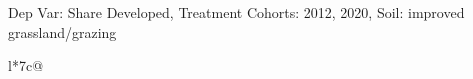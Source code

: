 \begin{table}[H]
\captionlistentry[table]{}
\label{table:beaver_land_class_DVis_land_class_3_SCg13_SSIGRG}
\scriptsize %
Dep Var: Share Developed, Treatment Cohorts: 2012, 2020, Soil: improved grassland/grazing \\
\begin{threeparttable}
\begin{tabulary}{\textwidth}{l*{7}{c}@{}}
\toprule \toprule
\noalign{\smallskip}
\noalign{\smallskip}
\midrule \bottomrule
\end{tabulary}
\medskip
\end{threeparttable}
\end{table}
